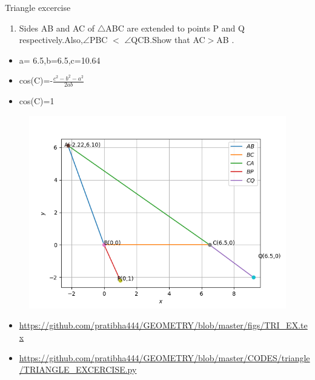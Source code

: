 \begin{frame}{Triangle excercise}
\begin{enumerate}
\item Sides AB and AC of $\triangle$ABC are extended to points P and Q respectively.Also,$\angle$PBC $<$ $\angle$QCB.Show that AC$>$AB .
\begin{center}

\end{center}
\end{enumerate}
\end{frame}
\begin{frame}
\begin{itemize}
\item a= 6.5,b=6.5,c=10.64
\item cos(C)=-$\frac{c^2 - b^2 -a^2}{2ab}$
\item cos(C)=1

\seti
\end{itemize}
\end{frame}
\begin{frame}
\begin{center}
\begin{figure}
\includegraphics[scale=.4]{./CODES/triangle/NEWTRI.png}
\end{figure}
\end{center}
\begin{itemize}
\item \url{https://github.com/pratibha444/GEOMETRY/blob/master/figs/TRI_EX.tex}
\item \url{https://github.com/pratibha444/GEOMETRY/blob/master/CODES/triangle/TRIANGLE_EXCERCISE.py}
\end{itemize}
\end{frame}



